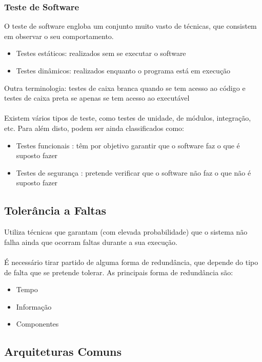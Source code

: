 \documentclass[10pt,a4paper]{report}
\begin{document}
\subsubsection{Teste de Software}
O teste de software engloba um conjunto muito vasto de técnicas, que consistem em observar o seu comportamento. 
\begin{itemize}
\item Testes estáticos: realizados sem se executar o software
\item Testes dinâmicos: realizados enquanto o programa está em execução
\end{itemize}
Outra terminologia: testes de caixa branca quando se tem acesso ao código e testes de caixa preta se apenas se tem acesso ao executável\\
\\
Existem vários tipos de teste, como testes de unidade, de módulos, integração, etc. Para além disto, podem ser ainda classificados como:
\begin{itemize}
\item Testes funcionais : têm por objetivo garantir que o software faz o que é suposto fazer
\item Testes de segurança : pretende verificar que o software não faz o que não é suposto fazer
\end{itemize}
\subsection{Tolerância a Faltas}
Utiliza técnicas que garantam (com elevada probabilidade) que o sistema não falha ainda que ocorram faltas durante a sua execução.\\
\\
É necessário tirar partido de alguma forma de redundância, que depende do tipo de falta que se pretende tolerar. As principais forma de redundância são:
\begin{itemize}
\item Tempo
\item Informação
\item Componentes
\end{itemize}
\subsection{Arquiteturas Comuns}
\end{document}
